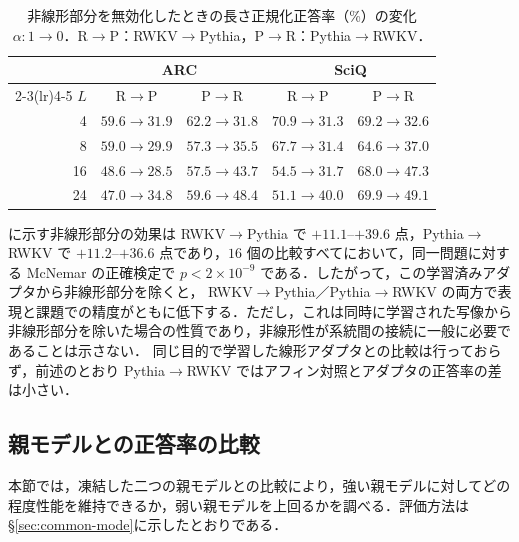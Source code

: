 \documentclass[techrep,noauthor]{ipsj}
\newcommand{\rev}[1]{{\color{blue}#1}}
\newcommand{\revr}[1]{{\color{red}#1}}
\newcommand{\revp}[1]{{\color{violet}#1}}
\newcommand{\RtoP}{\textsf{RWKV$\to$\allowbreak Pythia}}
\newcommand{\PtoR}{\textsf{Pythia$\to$\allowbreak RWKV}}
\begin{document}
\begin{table}[!t]\centering\small
\caption{\rev{非線形部分を無効化したときの長さ正規化正答率（\%）の変化 $\alpha:1\!\to\!0$．R$\to$P：RWKV$\to$Pythia，P$\to$R：Pythia$\to$RWKV．}}\label{tab:mlp-intervention}
\setlength{\tabcolsep}{3pt}
{\color{blue}
\begin{tabular}{rcccc}\toprule
& \multicolumn{2}{c}{\revp{ARC}} & \multicolumn{2}{c}{SciQ}\\
\cmidrule(lr){2-3}\cmidrule(lr){4-5}
$L$ & \textsf{R$\to$P} & \textsf{P$\to$R} & \textsf{R$\to$P} & \textsf{P$\to$R}\\\midrule
4  & $59.6\!\to\!31.9$ & $62.2\!\to\!31.8$ & $70.9\!\to\!31.3$ & $69.2\!\to\!32.6$\\
8  & $59.0\!\to\!29.9$ & $57.3\!\to\!35.5$ & $67.7\!\to\!31.4$ & $64.6\!\to\!37.0$\\
16 & $48.6\!\to\!28.5$ & $57.5\!\to\!43.7$ & $54.5\!\to\!31.7$ & $68.0\!\to\!47.3$\\
24 & $47.0\!\to\!34.8$ & $59.6\!\to\!48.4$ & $51.1\!\to\!40.0$ & $69.9\!\to\!49.1$\\\bottomrule
\end{tabular}}
\end{table}

 に示す\rev{非線形部分}の効果は \RtoP{} で $+11.1$--$+39.6$ 点，\PtoR{} で
$+11.2$--$+36.6$ 点であり，$16$ 個の比較すべてにおいて，同一問題に対する McNemar の正確検定で
$p<2{\times}10^{-9}$ である．したがって，この学習済みアダプタから\rev{非線形部分}を除くと，
\RtoP{}／\PtoR{} の両方で表現と\rev{課題での精度}がともに低下する．\rev{ただし，これは同時に学習された写像から
非線形部分を除いた場合の性質であり，非線形性が系統間の接続に一般に必要であることは示さない．
同じ目的で学習した線形アダプタとの比較は行っておらず，前述のとおり \PtoR{} ではアフィン対照とアダプタの正答率の差は小さい．}

\subsection{\revr{親モデルとの正答率の比較}}\label{sec:goal}
\revr{本節では，凍結した二つの親モデルとの比較により，強い親モデルに対してどの程度性能を維持できるか，弱い親モデルを上回るかを調べる．評価方法は\S\ref{sec:common-mode}に示したとおりである．}
\end{document}
